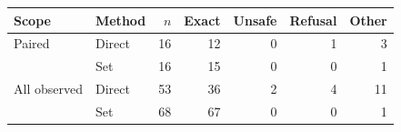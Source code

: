 \begin{tabular}{@{}llrrrrr@{}}
\toprule
Scope & Method & $n$ & Exact & Unsafe & Refusal & Other\\
\midrule
Paired & Direct & 16 & 12 & 0 & 1 & 3\\
 & Set & 16 & 15 & 0 & 0 & 1\\
All observed & Direct & 53 & 36 & 2 & 4 & 11\\
 & Set & 68 & 67 & 0 & 0 & 1\\
\bottomrule
\end{tabular}
